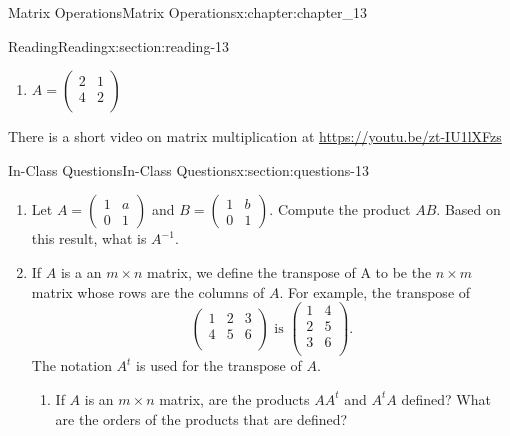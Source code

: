 \documentclass[oneside,10pt,]{book}
\numberwithin{equation}{section}
\begin{document}
\begin{chapterptx}{Matrix Operations}{}{Matrix Operations}{}{}{x:chapter:chapter_13}
\begin{sectionptx}{Reading}{}{Reading}{}{}{x:section:reading-13}
\begin{itemize}[label=\textbullet]
\begin{enumerate}[label=(\alph*)]
\right)\)%
\item{}\(\displaystyle A = \left(
\begin{array}{cc}
2 & 1 \\
4 & 2 \\
\end{array}
\right)\)%
\end{enumerate}
%
\end{itemize}
%
\par
There is a short video on matrix multiplication at \url{https://youtu.be/zt-IU1lXFzs}%
\end{sectionptx}
%
%
\typeout{************************************************}
\typeout{************************************************}
%
\begin{sectionptx}{In-Class Questions}{}{In-Class Questions}{}{}{x:section:questions-13}
%
\begin{enumerate}[label=\arabic*.]
\item{}Let \(A=\left(\begin{array}{cc} 1 & a\\ 0 & 1 \end{array}\right)\) and \(B=\left(\begin{array}{cc} 1 & b\\ 0 & 1 \end{array}\right)\).  Compute the product \(A B\).  Based on this result, what is \(A^{-1}\).%
\item{}If \(A\) is a an \(m \times n\) matrix, we define the transpose of A to be the \(n \times m\) matrix whose rows are the columns of \(A\).  For example, the transpose of%
\begin{equation*}
\left(
\begin{array}{ccc}
1 &2 &3 \\
4 &5 &6 \\
\end{array}
\right) \textrm{  is  }
\left(
\begin{array}{cc}
1 &4 \\
2 &5 \\
3 &6 \\
\end{array}
\right).
\end{equation*}
The notation \(A^t\) is used for the transpose of \(A\).%
\begin{enumerate}[label=(\alph*)]
\item{}If \(A\) is an \(m \times n\) matrix, are the products \(A A^t\) and \(A^t A \) defined?  What are the orders of the products that are defined?%

\end{enumerate}
\end{enumerate}
\end{sectionptx}
\end{chapterptx}
\end{document}
